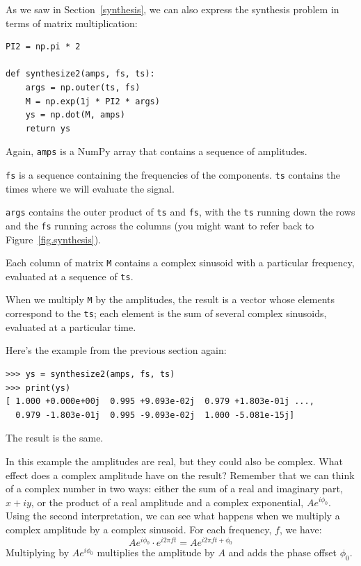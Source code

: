 \documentclass[12pt]{book}
\begin{document}
As we saw in Section~\ref{synthesis}, we can also express the synthesis
problem in terms of matrix multiplication: 

\begin{verbatim}
PI2 = np.pi * 2

def synthesize2(amps, fs, ts):
    args = np.outer(ts, fs)
    M = np.exp(1j * PI2 * args)
    ys = np.dot(M, amps)
    return ys
\end{verbatim}

Again, {\tt amps} is a NumPy array that contains a sequence of
amplitudes.

{\tt fs} is a sequence containing the frequencies of the
components.  {\tt ts} contains the times where we will evaluate
the signal.

{\tt args} contains the outer product of {\tt ts} and {\tt fs},
with the {\tt ts} running down the rows and the {\tt fs} running
across the columns (you might want to refer back to
Figure~\ref{fig.synthesis}).

Each column of matrix {\tt M} contains a complex sinusoid with
a particular frequency, evaluated at a sequence of {\tt ts}.

When we multiply {\tt M} by the amplitudes, the result is a vector
whose elements correspond to the {\tt ts}; each element is the sum of
several complex sinusoids, evaluated at a particular time.

Here's the example from the previous section again:

\begin{verbatim}
>>> ys = synthesize2(amps, fs, ts)
>>> print(ys)
[ 1.000 +0.000e+00j  0.995 +9.093e-02j  0.979 +1.803e-01j ...,
  0.979 -1.803e-01j  0.995 -9.093e-02j  1.000 -5.081e-15j]
\end{verbatim}

The result is the same.

In this example the amplitudes are real, but they could also be
complex.  What effect does a complex amplitude have on the result?
Remember that we can think of a complex number in two ways: either the
sum of a real and imaginary part, $x + i y$, or the product of a real
amplitude and a complex exponential, $A e^{i \phi_0}$.  Using the
second interpretation, we can see what happens when we multiply
a complex amplitude by a complex sinusoid.  For each frequency, $f$,
we have:
%
\[ A e^{i \phi_0} \cdot e^{i 2 \pi f t} = A e^{i 2 \pi f t + \phi_0} \]
%
Multiplying by $A e^{i \phi_0}$ multiplies the amplitude by $A$
and adds the phase offset $\phi_0$.
\end{document}
